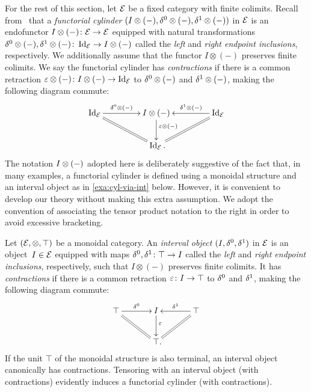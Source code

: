 \documentclass[reqno,10pt,a4paper,oneside,draft]{amsart}
\begin{document}
For the rest of this section, let $\mathcal{E}$ be a fixed category with finite colimits.
Recall from~\cite{kamps-porter:homotopy} that a \emph{functorial cylinder} $(I \otimes (-), \delta^0 \otimes (-), \delta^1 \otimes (-))$ in $\mathcal{E}$ is an endofunctor $I \otimes (-) \colon \mathcal{E} \to \mathcal{E}$ equipped with natural transformations $\delta^0 \otimes (-), \delta^1 \otimes (-) \colon \operatorname{Id}_{\mathcal{E}} \to I \otimes (-)$ called the \emph{left} and \emph{right endpoint inclusions}, respectively.
We additionally assume that the functor $I \otimes (-)$ preserves finite colimits.
We say the functorial cylinder has \emph{contractions} if there is a common retraction $\varepsilon \otimes (-) \colon I \otimes (-) \to \operatorname{Id}_{\mathcal{E}}$ to $\delta^0 \otimes (-)$ and $\delta^1 \otimes (-)$, making the following diagram commute:
\[
\xymatrix@C+2em{
  \Id_\catE
  \ar[r]^-{\lcyl \otimes (-)}
  \ar@{=}[dr]
&
  \interval \otimes (-)
  \ar[d]^(0.4){\ccyl \otimes (-)}
&
  \Id_\catE
  \ar[l]_-{\rcyl \otimes (-)}
  \ar@{=}[dl]
\\&
  \Id_\catE
\rlap{.}}
\]
The notation $I \otimes (-)$ adopted here is deliberately suggestive of the fact that, in many examples, a functorial cylinder is defined using a monoidal structure and an interval object as in \cref{exa:cyl-via-int} below.
However, it is convenient to develop our theory without making this extra assumption.
We adopt the convention of associating the tensor product notation to the right in order to avoid excessive bracketing.

\begin{example} \label{exa:cyl-via-int}
Let $(\mathcal{E}, \otimes, \top)$ be a monoidal category.
An \emph{interval object} $(I, \delta^0, \delta^1)$ in $\mathcal{E}$ is an object~$I \in \mathcal{E}$ equipped with maps $\delta^0, \delta^1 \colon \top \to I$ called the \emph{left} and \emph{right endpoint inclusions}, respectively, such that $I \otimes (-)$ preserves finite colimits.
It has \emph{contractions} if there is a common retraction $\varepsilon \colon I \to \top$ to $\delta^0$ and $\delta^1$, making the following diagram commute:
\[
\xymatrix@C+1em{
  \top
  \ar[r]^-{\lcyl}
  \ar@{=}[dr]
&
  \interval
  \ar[d]^(0.4){\ccyl}
&
  \top
  \ar[l]_-{\rcyl}
  \ar@{=}[dl]
\\&
  \top
\rlap{.}}
\]
If the unit $\top$ of the monoidal structure is also terminal, an interval object canonically has contractions.
Tensoring with an interval object (with contractions) evidently induces a functorial cylinder (with contractions).
\end{example}
\end{document}
